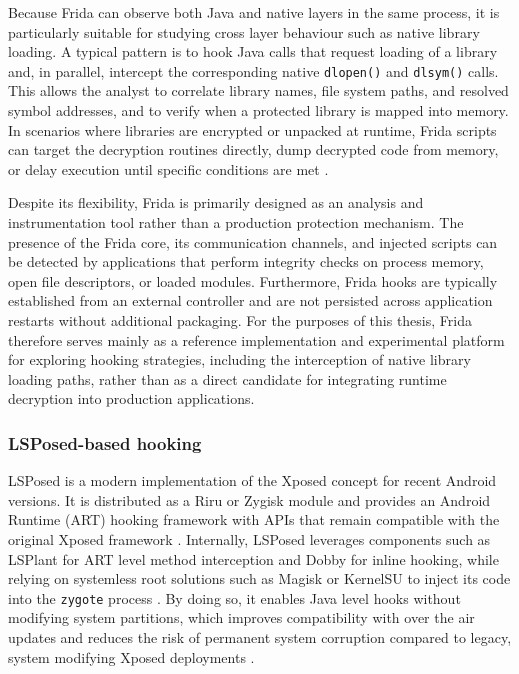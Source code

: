 \documentclass[11pt,a4paper]{report}
\renewcommand\_{{\textunderscore\allowbreak}}
\begin{document}
Because Frida can observe both Java and native layers in the same process, it is particularly suitable for studying cross layer behaviour such as native library loading. A typical pattern is to hook Java calls that request loading of a library and, in parallel, intercept the corresponding native \texttt{dlopen()} and \texttt{dlsym()} calls. This allows the analyst to correlate library names, file system paths, and resolved symbol addresses, and to verify when a protected library is mapped into memory. In scenarios where libraries are encrypted or unpacked at runtime, Frida scripts can target the decryption routines directly, dump decrypted code from memory, or delay execution until specific conditions are met \cite{ronin2018hooking,kumar2023inviseal}.

Despite its flexibility, Frida is primarily designed as an analysis and instrumentation tool rather than a production protection mechanism. The presence of the Frida core, its communication channels, and injected scripts can be detected by applications that perform integrity checks on process memory, open file descriptors, or loaded modules. Furthermore, Frida hooks are typically established from an external controller and are not persisted across application restarts without additional packaging. For the purposes of this thesis, Frida therefore serves mainly as a reference implementation and experimental platform for exploring hooking strategies, including the interception of native library loading paths, rather than as a direct candidate for integrating runtime decryption into production applications.

\subsubsection{LSPosed-based hooking}

LSPosed is a modern implementation of the Xposed concept for recent Android versions. It is distributed as a Riru or Zygisk module and provides an Android Runtime (ART) hooking framework with APIs that remain compatible with the original Xposed framework \cite{xposed2013framework,lsposed2025github}. Internally, LSPosed leverages components such as LSPlant for ART level method interception and Dobby for inline hooking, while relying on systemless root solutions such as Magisk or KernelSU to inject its code into the \texttt{zygote} process \cite{lsposed2025github,lsposed2025website}. By doing so, it enables Java level hooks without modifying system partitions, which improves compatibility with over the air updates and reduces the risk of permanent system corruption compared to legacy, system modifying Xposed deployments \cite{androidroot2024lsposed,promon2024hooking}.
\end{document}
